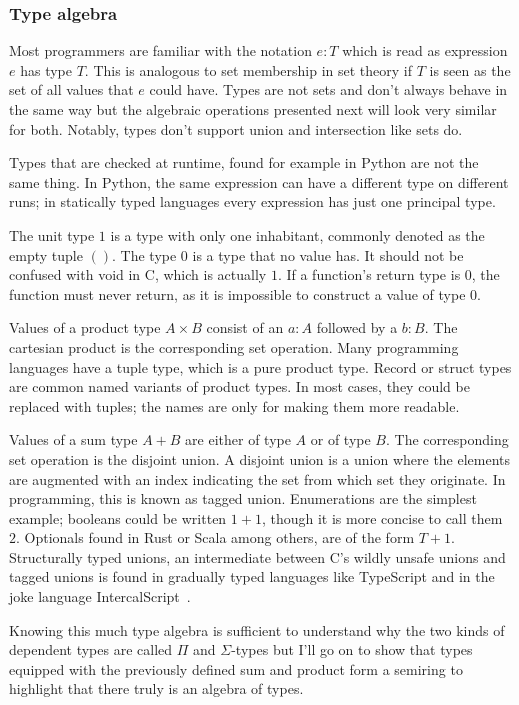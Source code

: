 \documentclass[english, 12pt, a4paper, sci, a-1b, online]{aaltothesis}
\begin{document}
\subsubsection{Type algebra}

Most programmers are familiar with the notation $e : T$ which is read as expression $e$ has type $T$. This is analogous to set membership in set theory if $T$ is seen as the set of all values that $e$ could have. Types are not sets and don't always behave in the same way but the algebraic operations presented next will look very similar for both. Notably, types don't support union and intersection like sets do.

Types that are checked at runtime, found for example in Python are not the same thing. In Python, the same expression can have a different type on different runs; in statically typed languages every expression has just one principal type.

The unit type $1$ is a type with only one inhabitant, commonly denoted as the empty tuple $()$. The type $0$ is a type that no value has. It should not be confused with void in C, which is actually $1$. If a function's return type is $0$, the function must never return, as it is impossible to construct a value of type $0$.

Values of a product type $A \times B$ consist of an $a : A$ followed by a $b : B$. The cartesian product is the corresponding set operation. Many programming languages have a tuple type, which is a pure product type. Record or struct types are common named variants of product types. In most cases, they could be replaced with tuples; the names are only for making them more readable.

Values of a sum type $A + B$ are either of type $A$ or of type $B$. The corresponding set operation is the disjoint union. A disjoint union is a union where the elements are augmented with an index indicating the set from which set they originate. In programming, this is known as tagged union. Enumerations are the simplest example; booleans could be written $1 + 1$, though it is more concise to call them $2$. Optionals found in Rust or Scala among others, are of the form $T + 1$. Structurally typed unions, an intermediate between C's wildly unsafe unions and tagged unions is found in gradually typed languages like TypeScript and in the joke language IntercalScript~\cite{ICS}.

Knowing this much type algebra is sufficient to understand why the two kinds of dependent types are called $\Pi$ and $\Sigma$-types but I'll go on to show that types equipped with the previously defined sum and product form a semiring to highlight that there truly is an algebra of types.
\end{document}
